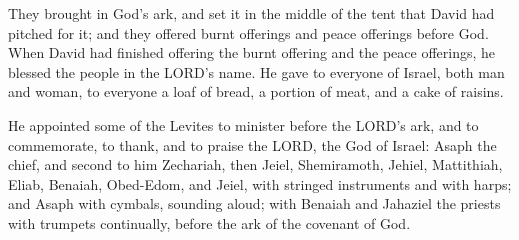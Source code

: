  They brought in God's ark, and set it in the middle of
the tent that David had pitched for it; and they offered burnt offerings
and peace offerings before God.  When David had finished
offering the burnt offering and the peace offerings, he blessed the
people in the LORD's name.  He gave to everyone of Israel,
both man and woman, to everyone a loaf of bread, a portion of meat, and
a cake of raisins.

 He appointed some of the Levites to minister before the
LORD's ark, and to commemorate, to thank, and to praise the LORD, the
God of Israel:  Asaph the chief, and second to him
Zechariah, then Jeiel, Shemiramoth, Jehiel, Mattithiah, Eliab, Benaiah,
Obed-Edom, and Jeiel, with stringed instruments and with harps; and
Asaph with cymbals, sounding aloud;  with Benaiah and
Jahaziel the priests with trumpets continually, before the ark of the
covenant of God.

